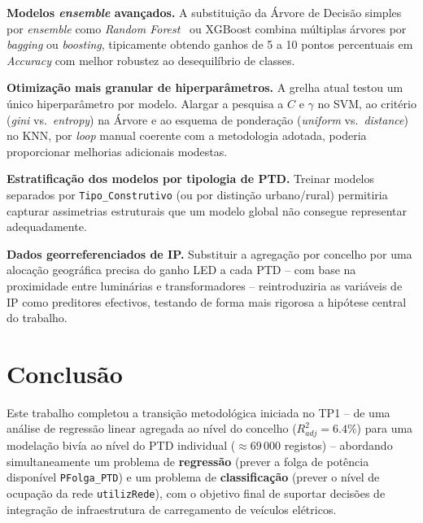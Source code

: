 \documentclass[conference]{IEEEtran}
\begin{document}
\textbf{Modelos \textit{ensemble} avan\c{c}ados.} A substitui\c{c}\~ao
da \'Arvore de Decis\~ao simples por \textit{ensemble} como \textit{Random
Forest}~\cite{b7} ou XGBoost combina m\'ultiplas \'arvores por
\textit{bagging} ou \textit{boosting}, tipicamente obtendo ganhos de 5 a
10 pontos percentuais em \textit{Accuracy} com melhor robustez ao
desequil\'ibrio de classes.
 
\textbf{Otimiza\c{c}\~ao mais granular de hiperpar\^ametros.} A grelha
atual testou um \'unico hiperpar\^ametro por modelo. Alargar a pesquisa
a $C$ e $\gamma$ no SVM, ao crit\'erio (\textit{gini} vs.\
\textit{entropy}) na \'Arvore e ao esquema de pondera\c{c}\~ao
(\textit{uniform} vs.\ \textit{distance}) no KNN, por \textit{loop}
manual coerente com a metodologia adotada, poderia proporcionar melhorias
adicionais modestas.
 
\textbf{Estratifica\c{c}\~ao dos modelos por tipologia de PTD.} Treinar
modelos separados por \texttt{Tipo\_Construtivo} (ou por distinção
urbano/rural) permitiria capturar assimetrias estruturais que um modelo
global n\~ao consegue representar adequadamente.
 
\textbf{Dados georreferenciados de IP.} Substituir a agrega\c{c}\~ao por
concelho por uma aloca\c{c}\~ao geogr\'afica precisa do ganho LED a cada
PTD -- com base na proximidade entre lumin\'arias e transformadores --
reintroduziria as vari\'aveis de IP como preditores efectivos, testando
de forma mais rigorosa a hip\'otese central do trabalho.
 
\section{Conclus\~ao}

Este trabalho completou a transi\c{c}\~ao metodol\'ogica iniciada no TP1
-- de uma an\'alise de regress\~ao linear agregada ao n\'ivel do concelho
($R^2_{adj} = 6.4\%$) para uma modelação biv\'ia ao n\'ivel do PTD
individual ($\approx69\,000$ registos) -- abordando simultaneamente um
problema de \textbf{regress\~ao} (prever a folga de pot\^encia dispon\'ivel
\texttt{PFolga\_PTD}) e um problema de \textbf{classifica\c{c}\~ao} (prever
o n\'ivel de ocupa\c{c}\~ao da rede \texttt{utilizRede}), com o objetivo
final de suportar decis\~oes de integra\c{c}\~ao de infraestrutura de
carregamento de ve\'iculos el\'etricos.
\end{document}

